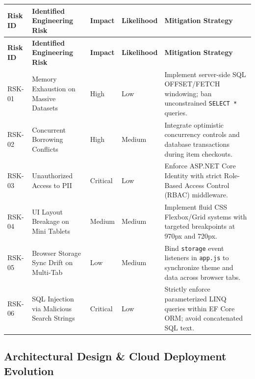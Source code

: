 \documentclass[10pt,journal,compsoc]{IEEEtran}
\begin{document}
\vspace{10pt}
\noindent
\begin{center}
\renewcommand{\arraystretch}{1.25}
\begin{longtable}{|L{1.8cm}|L{3.8cm}|L{1.8cm}|L{2.0cm}|L{5.6cm}|}
\hline
{}
\textbf{\color{white}Risk ID} & \textbf{\color{white}Identified Engineering Risk} & \textbf{\color{white}Impact} & \textbf{\color{white}Likelihood} & \textbf{\color{white}Mitigation Strategy} \\
\hline
\endfirsthead
\hline
{}
\textbf{\color{white}Risk ID} & \textbf{\color{white}Identified Engineering Risk} & \textbf{\color{white}Impact} & \textbf{\color{white}Likelihood} & \textbf{\color{white}Mitigation Strategy} \\
\hline
\endhead
RSK-01 & Memory Exhaustion on Massive Datasets & High & Low & Implement server-side SQL OFFSET/FETCH windowing; ban unconstrained \texttt{SELECT *} queries. \\
\hline
{}
RSK-02 & Concurrent Borrowing Conflicts & High & Medium & Integrate optimistic concurrency controls and database transactions during item checkouts. \\
\hline
RSK-03 & Unauthorized Access to PII & Critical & Low & Enforce ASP.NET Core Identity with strict Role-Based Access Control (RBAC) middleware. \\
\hline
{}
RSK-04 & UI Layout Breakage on Mini Tablets & Medium & Medium & Implement fluid CSS Flexbox/Grid systems with targeted breakpoints at 970px and 720px. \\
\hline
RSK-05 & Browser Storage Sync Drift on Multi-Tab & Low & Medium & Bind \texttt{storage} event listeners in \texttt{app.js} to synchronize theme and data across browser tabs. \\
\hline
{}
RSK-06 & SQL Injection via Malicious Search Strings & Critical & Low & Strictly enforce parameterized LINQ queries within EF Core ORM; avoid concatenated SQL text. \\
\hline
\end{longtable}
\end{center}

\newpage

\subsection{Architectural Design \& Cloud Deployment Evolution}
\end{document}
